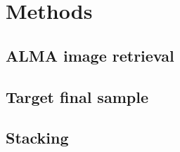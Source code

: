 \chapter[METHODS]{Methods} \label{chap:method}
\pagestyle{myheadings}

\section{ALMA image retrieval}\label{sec:method_A}

\kant[22-28]  %

\section{Target final sample}\label{sec:method_B}

\kant[29-31]  %
    
\section{Stacking}\label{sec:method_C}

\kant[32-27]  %


%

